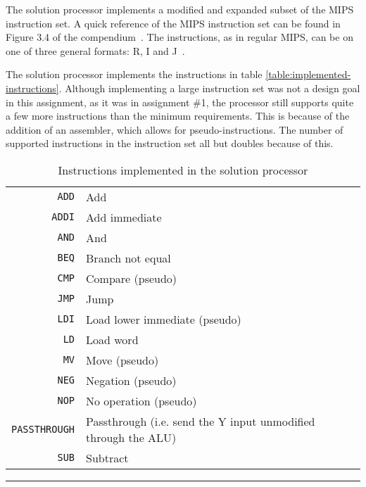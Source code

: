 The solution processor implements a modified and expanded subset of the MIPS instruction set.
A quick reference of the MIPS instruction set can be found in Figure 3.4 of the compendium~\cite[p.112]{compendium}.
The instructions, as in regular MIPS, can be on one of three general formats: R, I and J~\cite[p.109-11]{compendium}.

The solution processor implements the instructions in table \vref{table:implemented-instructions}.
Although implementing a large instruction set was not a design goal in this assignment, as it was in assignment \#1\cite{assignment-1}, the processor still supports quite a few more instructions than the minimum requirements.
This is because of the addition of an assembler, which allows for pseudo-instructions.
The number of supported instructions in the instruction set all but doubles because of this.

\begin{table}[H]
    \begin{center}
        \begin{tabular}{r|l}
            \texttt{ADD} & Add \\
            \texttt{ADDI} & Add immediate \\
            \texttt{AND} & And \\
            \texttt{BEQ} & Branch not equal \\
            \texttt{CMP} & Compare (pseudo) \\
            \texttt{JMP} & Jump \\
            \texttt{LDI} & Load lower immediate (pseudo) \\
            \texttt{LD} & Load word \\
            \texttt{MV} & Move (pseudo) \\
            \texttt{NEG} & Negation (pseudo) \\
            \texttt{NOP} & No operation (pseudo) \\
            \texttt{PASSTHROUGH} & Passthrough (i.e. send the Y input unmodified through the ALU) \\
            \texttt{SUB} & Subtract \\
        \end{tabular}
        \smallskip
        \hrule
        \smallskip
        \caption{Instructions implemented in the solution processor}
        \label{table:implemented-instructions}
    \end{center}
\end{table}
